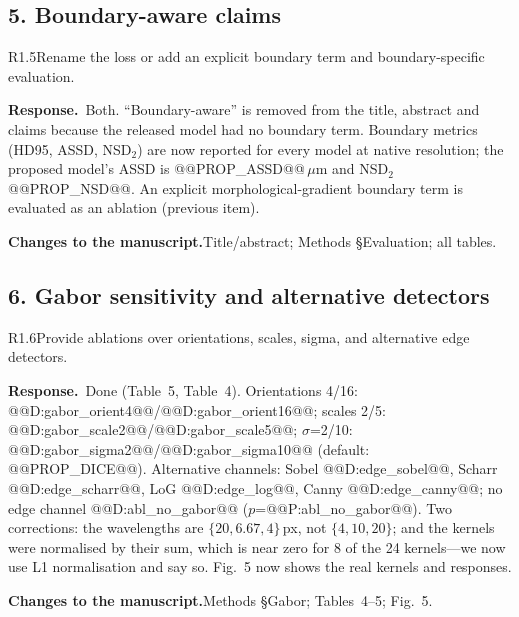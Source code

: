 \documentclass[11pt]{article}
\newcommand{\response}{\par\medskip\noindent\textbf{\color{bblue}Response.}\ }
\newcommand{\actions}{\par\medskip\noindent\textbf{Changes to the manuscript.}}
\begin{document}
\subsection*{5. Boundary-aware claims}
\begin{rcomment}{R1.5}Rename the loss or add an explicit boundary term and boundary-specific evaluation.\end{rcomment}
\response Both. ``Boundary-aware'' is removed from the title, abstract and claims because the released model had no boundary term. Boundary metrics (HD95, ASSD, NSD$_2$) are now reported for every model at native resolution; the proposed model's ASSD is @@PROP_ASSD@@\,$\mu$m and NSD$_2$ @@PROP_NSD@@. An explicit morphological-gradient boundary term is evaluated as an ablation (previous item).
\actions Title/abstract; Methods §Evaluation; all tables.

\subsection*{6. Gabor sensitivity and alternative detectors}
\begin{rcomment}{R1.6}Provide ablations over orientations, scales, sigma, and alternative edge detectors.\end{rcomment}
\response Done (Table~5, Table~4). Orientations 4/16: @@D:gabor_orient4@@/@@D:gabor_orient16@@; scales 2/5: @@D:gabor_scale2@@/@@D:gabor_scale5@@; $\sigma$=2/10: @@D:gabor_sigma2@@/@@D:gabor_sigma10@@ (default: @@PROP_DICE@@). Alternative channels: Sobel @@D:edge_sobel@@, Scharr @@D:edge_scharr@@, LoG @@D:edge_log@@, Canny @@D:edge_canny@@; no edge channel @@D:abl_no_gabor@@ ($p$=@@P:abl_no_gabor@@). Two corrections: the wavelengths are $\{20,6.67,4\}$\,px, not $\{4,10,20\}$; and the kernels were normalised by their sum, which is near zero for 8 of the 24 kernels---we now use L1 normalisation and say so. Fig.~5 now shows the real kernels and responses.
\actions Methods §Gabor; Tables~4--5; Fig.~5.
\end{document}
